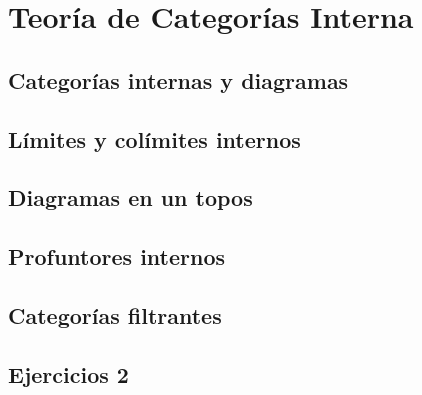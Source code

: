 \chapter{Teoría de Categorías Interna}
\label{cap:2}

\section{Categorías internas y diagramas}
\label{sec:2.1}

\section{Límites y colímites internos}
\label{sec:2.2}

\section{Diagramas en un topos}
\label{sec:2.3}

\section{Profuntores internos}
\label{sec:2.4}

\section{Categorías filtrantes}
\label{sec:2.5}

\section*{Ejercicios 2}
\label{sec:ejercicios-2}
